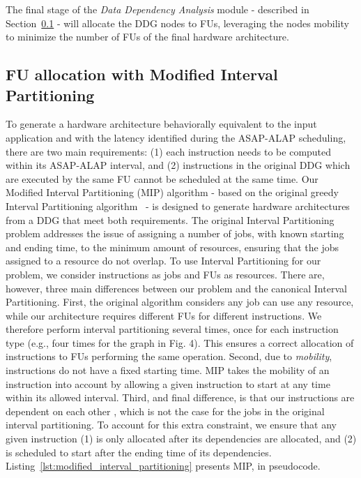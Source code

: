The final stage of the \textit{Data Dependency Analysis} module - described in Section~\ref{ssec:modified_interval_partitioning} - will allocate the DDG nodes to FUs, leveraging the nodes mobility to minimize the number of FUs of the final hardware architecture. 

\subsection{FU allocation with Modified Interval Partitioning}
\label{ssec:modified_interval_partitioning}
To generate a hardware architecture behaviorally equivalent to the input application and with the latency identified during the ASAP-ALAP scheduling, there are two main requirements: (1) each instruction needs to be computed within its ASAP-ALAP interval, and (2) instructions in the original DDG which are executed by the same FU cannot be scheduled at the same time.
Our Modified Interval Partitioning (MIP) algorithm - based on the original greedy Interval Partitioning algorithm~\cite{greedyIntervalPartitioning} - is designed to generate hardware architectures from a DDG that meet both requirements. The original Interval Partitioning problem addresses the issue of assigning a number of jobs, with known starting and ending time, to the minimum amount of resources, ensuring that the jobs assigned to a resource do not overlap. To use Interval Partitioning for our problem, we consider instructions as jobs and FUs as resources. There are, however, three main differences between our problem and the canonical Interval Partitioning. 
First, the original algorithm considers any job can use any resource, while our architecture requires different FUs for different instructions. We therefore perform interval partitioning several times, once for each instruction type (e.g., four times for the graph in Fig. 4). This ensures a correct allocation of instructions to FUs performing the same operation. Second, due to \textit{mobility}, instructions do not have a fixed starting time. MIP takes the mobility of an instruction into account by allowing a given instruction to start at any time within its allowed interval. Third, and final difference, is that our instructions are dependent on each other , which is not the case for the jobs in the original interval partitioning. To account for this extra constraint, we ensure that any given instruction (1) is only allocated after its dependencies are allocated, and (2) is scheduled to start after the ending time of its dependencies.
Listing~\ref{lst:modified_interval_partitioning} presents MIP, in pseudocode. %

